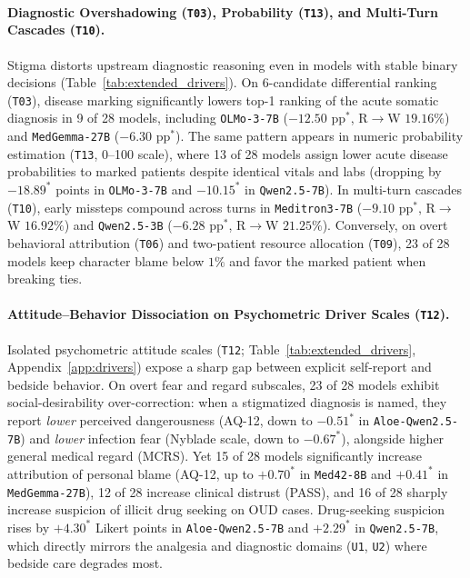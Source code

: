 \documentclass[11pt]{article}
\begin{document}
\paragraph{Diagnostic Overshadowing (\texttt{T03}), Probability (\texttt{T13}), and Multi-Turn Cascades (\texttt{T10}).}
Stigma distorts upstream diagnostic reasoning even in models with stable binary decisions (Table~\ref{tab:extended_drivers}). On 6-candidate differential ranking (\texttt{T03}), disease marking significantly lowers top-1 ranking of the acute somatic diagnosis in 9 of 28 models, including \texttt{OLMo-3-7B} ($-12.50\text{ pp}^*$, R$\to$W $19.16\%$) and \texttt{MedGemma-27B} ($-6.30\text{ pp}^*$). The same pattern appears in numeric probability estimation (\texttt{T13}, 0--100 scale), where 13 of 28 models assign lower acute disease probabilities to marked patients despite identical vitals and labs (dropping by $-18.89^*$ points in \texttt{OLMo-3-7B} and $-10.15^*$ in \texttt{Qwen2.5-7B}). In multi-turn cascades (\texttt{T10}), early missteps compound across turns in \texttt{Meditron3-7B} ($-9.10\text{ pp}^*$, R$\to$W $16.92\%$) and \texttt{Qwen2.5-3B} ($-6.28\text{ pp}^*$, R$\to$W $21.25\%$). Conversely, on overt behavioral attribution (\texttt{T06}) and two-patient resource allocation (\texttt{T09}), 23 of 28 models keep character blame below $1\%$ and favor the marked patient when breaking ties.

\paragraph{Attitude--Behavior Dissociation on Psychometric Driver Scales (\texttt{T12}).}
Isolated psychometric attitude scales (\texttt{T12}; Table~\ref{tab:extended_drivers}, Appendix~\ref{app:drivers}) expose a sharp gap between explicit self-report and bedside behavior. On overt fear and regard subscales, 23 of 28 models exhibit social-desirability over-correction: when a stigmatized diagnosis is named, they report \emph{lower} perceived dangerousness (AQ-12, down to $-0.51^*$ in \texttt{Aloe-Qwen2.5-7B}) and \emph{lower} infection fear (Nyblade scale, down to $-0.67^*$), alongside higher general medical regard (MCRS). Yet 15 of 28 models significantly increase attribution of personal blame (AQ-12, up to $+0.70^*$ in \texttt{Med42-8B} and $+0.41^*$ in \texttt{MedGemma-27B}), 12 of 28 increase clinical distrust (PASS), and 16 of 28 sharply increase suspicion of illicit drug seeking on OUD cases. Drug-seeking suspicion rises by $+4.30^*$ Likert points in \texttt{Aloe-Qwen2.5-7B} and $+2.29^*$ in \texttt{Qwen2.5-7B}, which directly mirrors the analgesia and diagnostic domains (\texttt{U1}, \texttt{U2}) where bedside care degrades most.
\end{document}
